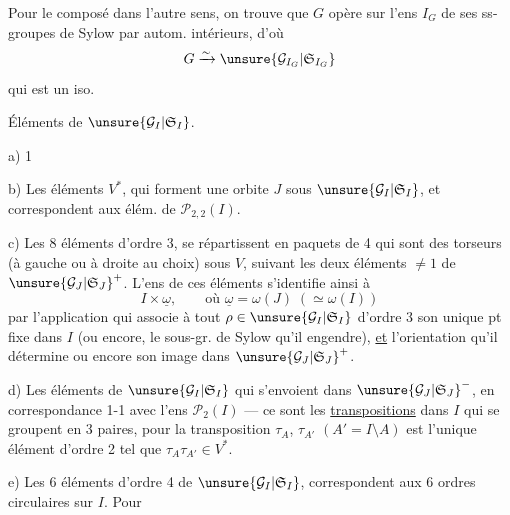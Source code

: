 Pour le composé dans l'autre sens, on trouve que $G$ opère sur l'ens $I_G$
de ses  ss-groupes de Sylow par autom. intérieurs, d'où
\[
 G\xrightarrow{\sim}\unsure{\mathcal{G}_{I_G}|\mathfrak{S}_{I_G}}
\]
qui est un iso.

Éléments de $\unsure{\mathcal{G}_I|\mathfrak{S}_I}$.

a) 1

b) Les  éléments  $V^*$,
qui forment une orbite $J$ sous $\unsure{\mathcal{G}_I|\mathfrak{S}_I}$, et correspondent
aux élém. de $\mathcal{P}_{2,2}(I)$.

c) Les  8 éléments d'ordre 3, se répartissent en
  paquets de 4 qui sont des torseurs
(à gauche ou à droite au choix) sous $V$, suivant les deux éléments
$\ne1$ de $\unsure{\mathcal{G}_J|\mathfrak{S}_J}^+$.
L'ens de ces éléments s'identifie ainsi à
\[
 I\times\underline{\omega},\qquad
 \text{où }\underline{\omega}=\omega(J)\;(\simeq\omega(I))
\]
par l'application qui associe à tout
$\rho\in\unsure{\mathcal{G}_I|\mathfrak{S}_I}$ d'ordre 3 son unique pt fixe dans $I$
(ou encore, le sous-gr. de Sylow qu'il engendre), \uline{et} l'orientation
qu'il détermine  ou encore son image dans
$\unsure{\mathcal{G}_J|\mathfrak{S}_J}^+$.

d) Les  éléments
 de $\unsure{\mathcal{G}_I|\mathfrak{S}_I}$
qui s'envoient dans $\unsure{\mathcal{G}_J|\mathfrak{S}_J}^-$, en correspondance 1-1
avec l'ens $\mathcal{P}_2(I)$ --- ce sont les \uline{transpositions} dans $I$
qui se groupent en 3  paires, pour la transposition
$\tau_A$, $\tau_{A'}$  $(A'=I\setminus A)$ est l'unique
 élément d'ordre 2 tel que $\tau_A\tau_{A'}\in V^*$.

e) Les 6 éléments d'ordre 4 de $\unsure{\mathcal{G}_I|\mathfrak{S}_I}$, correspondent aux
6 ordres circulaires sur $I$. Pour
